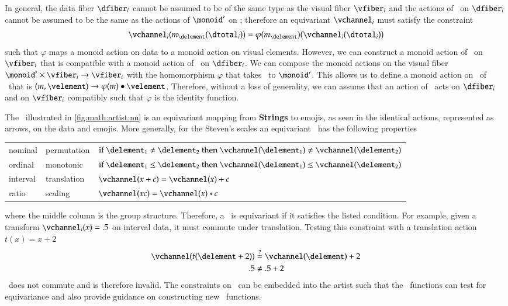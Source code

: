 \documentclass[journal]{vgtc}                %
\begin{document}
In general, the data fiber $\dfiber_{i}$ cannot be assumed to be of the same type as the visual fiber $\vfiber_{i}$ and the actions of \monoid\ on $\dfiber_{i}$ cannot be assumed to be the same as the actions of $\monoid^{\prime}$ on \vfiber; therefore an equivariant $\vchannel_i$ must satisfy the constraint  
\begin{equation}
\vchannel_i(m_{\delement}(\dtotal_i)) = \varphi(m_{\delement})(\vchannel_i(\dtotal_i))
\end{equation} 
such that $\varphi$ maps a monoid action on data to a monoid action on visual elements. However, we can construct a monoid action of \monoid\ on $\vfiber_{i}$ that is compatible with a monoid action of \monoid\ on $\dfiber_{i}$. We can compose the monoid actions on the visual fiber $\monoid^{\prime} \times \vfiber_{i} \rightarrow \vfiber_{i}$ with the homomorphism $\varphi$ that takes \monoid\ to $\monoid^{\prime}$. This allows us to define a monoid action on \vfiber\ of \monoid\ that is $(m, \velement) \rightarrow \varphi(m)\bullet\velement$. Therefore, without a loss of generality, we can assume that an action of \monoid\ acts on $\dfiber_{i}$ and on $\vfiber_{i}$ compatibly such that $\varphi$ is the identity function. 

The \vchannel\ illustrated in \autoref{fig:math:artist:nu} is an equivariant mapping from \textbf{Strings} to emojis, as seen in the identical actions, represented as arrows, on the data and emojis. More generally, for the Steven's scales\cite{stevensTheoryScalesMeasurement1946} an equivariant \vchannel\ has the following properties
\begin{table}[H]
  \begin{tabulary}{\columnwidth}{llL}
      nominal & permutation &  $\text{if } \delement_1 \neq \delement_2 \text{ then } \vchannel (\delement_1) \neq\vchannel(\delement_2)$\\
      ordinal &  monotonic & $\text{if } \delement_1 \leq \delement_2 \text{ then } \vchannel (\delement_1) \leq \vchannel(\delement_2)$\\
      interval &  translation &  $\vchannel (x + c) = \vchannel(x) + c$ \\
      ratio &  scaling &  $\vchannel(xc) = \vchannel(x)*c $\\
  \end{tabulary}
\end{table}
\noindent where the middle column is the group structure. Therefore, a \vchannel\ is equivariant if it satisfies the listed condition. For example, given a transform $\vchannel_{i}(x) = .5$ on interval data, it must commute under translation. Testing this constraint with a translation action $t(x) = x+2$
\begin{align*}
  \vchannel(t(\delement + 2)) & \overset{?}{=} \vchannel(\delement) + 2\\
  .5 &\neq .5 + 2
\end{align*}
\vchannel\ does not commute and is therefore invalid. The constraints on \vchannel\ can be embedded into the artist such that the \vchannel\ functions can test for equivariance and also provide guidance on constructing new \vchannel\ functions. 
\end{document}
